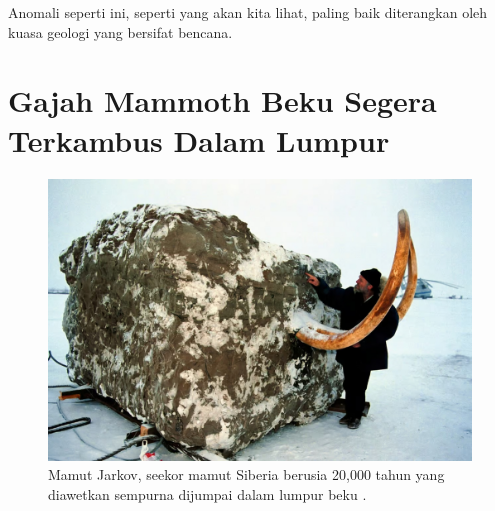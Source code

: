 \documentclass[10pt,twocolumn,letterpaper]{article}
\begin{document}
Anomali seperti ini, seperti yang akan kita lihat, paling baik diterangkan oleh kuasa geologi yang bersifat bencana.

\section{Gajah Mammoth Beku Segera Terkambus Dalam Lumpur}
\begin{figure}[t]
\begin{center}
   \includegraphics[width=1\linewidth]{jarkov-mammoth.jpg}
\end{center}
   \caption{Mamut Jarkov, seekor mamut Siberia berusia 20,000 tahun yang diawetkan sempurna dijumpai dalam lumpur beku \cite{51}.}
\label{fig:1}
\label{fig:onecol}
\end{figure}
\end{document}
